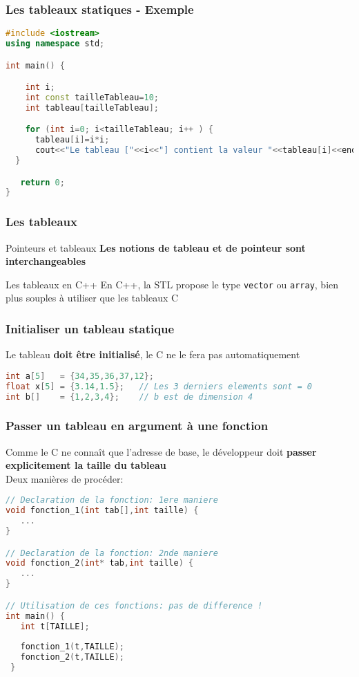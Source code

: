 \documentclass{beamer}
\begin{document}
\begin{frame}[fragile=singleslide,shrink=20]
\frametitle{Les tableaux statiques - Exemple}

\begin{lstlisting}[language=c++]
#include <iostream>
using namespace std;

int main() {

	int i;
	int const tailleTableau=10; 
	int tableau[tailleTableau]; 

	for (int i=0; i<tailleTableau; i++ ) {
      tableau[i]=i*i;
      cout<<"Le tableau ["<<i<<"] contient la valeur "<<tableau[i]<<endl;
  }

   return 0;
}
\end{lstlisting}


\end{frame}


\begin{frame}[fragile=singleslide,shrink=20]
\frametitle{Les tableaux}

\begin{block}{Pointeurs et tableaux}
\textbf{Les notions de tableau et de pointeur sont interchangeables}
\end{block}
\begin{block}{Les tableaux en C++}
En C++, la STL propose le type \texttt{vector} ou \texttt{array}, bien plus souples à utiliser que les tableaux C
\end{block}
\end{frame}

\begin{frame}[fragile=singleslide,shrink=20]
\frametitle{Initialiser un tableau statique}
Le tableau \textbf{doit être initialisé}, le C ne le fera pas automatiquement
\begin{lstlisting}[language=c++]
int a[5]   = {34,35,36,37,12};
float x[5] = {3.14,1.5};   // Les 3 derniers elements sont = 0
int b[]    = {1,2,3,4};    // b est de dimension 4
\end{lstlisting}
\end{frame}

\begin{frame}[fragile=singleslide,shrink=20]
\frametitle{Passer un tableau en argument à une fonction}
Comme le C ne connaît que l'adresse de base, le développeur doit \textbf{passer explicitement la taille du tableau} \\
Deux manières de procéder:
\begin{lstlisting}[language=c++]
// Declaration de la fonction: 1ere maniere
void fonction_1(int tab[],int taille) {
   ...
}

// Declaration de la fonction: 2nde maniere
void fonction_2(int* tab,int taille) {
   ...
}

// Utilisation de ces fonctions: pas de difference !
int main() {
   int t[TAILLE];
   
   fonction_1(t,TAILLE);
   fonction_2(t,TAILLE);
 }
\end{lstlisting}
\end{frame}
\end{document}
